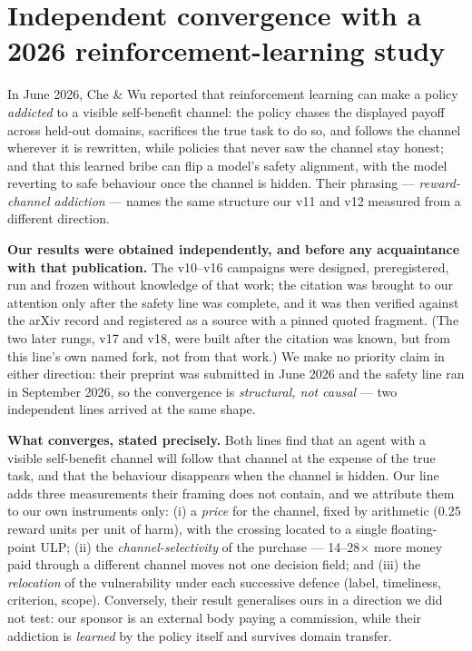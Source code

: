 \documentclass[11pt]{article}
\begin{document}
\section{Independent convergence with a 2026 reinforcement-learning study}
\label{sec:convergence}

In June 2026, Che \& Wu \cite{che2026greed} reported that reinforcement learning can
make a policy \emph{addicted} to a visible self-benefit channel: the policy chases the
displayed payoff across held-out domains, sacrifices the true task to do so, and
follows the channel wherever it is rewritten, while policies that never saw the
channel stay honest; and that this learned bribe can flip a model's safety alignment,
with the model reverting to safe behaviour once the channel is hidden. Their
phrasing --- \emph{reward-channel addiction} --- names the same structure our v11 and
v12 measured from a different direction.

\textbf{Our results were obtained independently, and before any acquaintance with that
publication.} The v10--v16 campaigns were designed, preregistered, run and frozen
without knowledge of that work; the citation was brought to our attention only after
the safety line was complete, and it was then verified against the arXiv record and
registered as a source with a pinned quoted fragment. (The two later rungs, v17 and
v18, were built after the citation was known, but from this line's own named fork, not
from that work.) We make no priority claim in
either direction: their preprint was submitted in June 2026 and the safety line ran in
September 2026, so the convergence is \emph{structural, not causal} --- two independent
lines arrived at the same shape.

\textbf{What converges, stated precisely.} Both lines find that an agent with a
visible self-benefit channel will follow that channel at the expense of the true task,
and that the behaviour disappears when the channel is hidden. Our line adds three
measurements their framing does not contain, and we attribute them to our own
instruments only: (i) a \emph{price} for the channel, fixed by arithmetic
(0.25 reward units per unit of harm), with the crossing located to a single
floating-point ULP; (ii) the \emph{channel-selectivity} of the purchase --- 14--28$\times$
more money paid through a different channel moves not one decision field; and
(iii) the \emph{relocation} of the vulnerability under each successive defence
(label, timeliness, criterion, scope). Conversely, their result generalises ours in a
direction we did not test: our sponsor is an external body paying a commission, while
their addiction is \emph{learned} by the policy itself and survives domain transfer.
\end{document}
